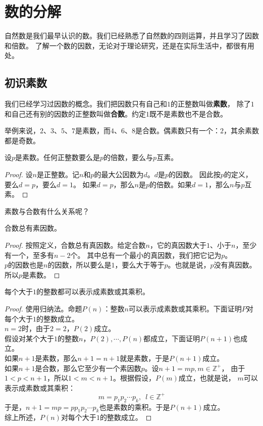 \documentclass[12pt,UTF8]{ctexbook}
\begin{document}
\chapter{数的分解}
自然数是我们最早认识的数。我们已经熟悉了自然数的四则运算，并且学习了因数和倍数。
了解一个数的因数，无论对于理论研究，还是在实际生活中，都很有用处。
\section{初识素数}
我们已经学习过因数的概念。我们把因数只有自己和$1$的正整数叫做\textbf{素数}，
除了$1$和自己还有别的因数的正整数叫做\textbf{合数}。约定$1$既不是素数也不是合数。

举例来说，$2$、$3$、$5$、$7$是素数，而$4$、$6$、$8$是合数。偶素数只有一个：$2$，其余素数都是奇数。

\begin{tm}\label{tm:1-0-0}
    设$p$是素数。任何正整数要么是$p$的倍数，要么与$p$互素。
\end{tm}
\begin{proof}
    设$n$是正整数。记$n$和$p$的最大公因数为$d$。$d$是$p$的因数。
    因此按$p$的定义，要么$d = p$，要么$d = 1$。
    如果$d = p$，那么$n$是$p$的倍数。如果$d = 1$，那么$n$与$p$互素。
\end{proof}

素数与合数有什么关系呢？

\begin{tm}\label{tm:1-0-4}
    合数总有素因数。
\end{tm}
\begin{proof}
    按照定义，合数总有真因数。给定合数$n$，它的真因数大于$1$、小于$n$，至少有一个，至多有$n-2$个。
    其中总有一个最小的真因数，我们把它记为$p$。\\
    $p$的因数也是$n$的因数，所以要么是$1$，要么大于等于$p$。也就是说，$p$没有真因数。所以$p$是素数。
\end{proof}

\begin{tm}\label{tm:1-0-6}
    每个大于$1$的整数都可以表示成素数或其乘积。
\end{tm}
\begin{proof}
    使用归纳法。命题$P(n)$：整数$n$可以表示成素数或其乘积。下面证明$P$对每个大于$1$的整数成立。\\
    $n=2$时，由于$2 = 2$，$P(2)$成立。\\
    假设对某个大于$1$的整数$n$，$P(2), \cdots, P(n)$都成立，下面证明$P(n+1)$也成立。\\
    如果$n+1$是素数，那么$n+1 = n+1$就是素数，于是$P(n+1)$成立。\\
    如果$n+1$是合数，那么它至少有一个素因数$p$。设$n+1 = mp, m\in\mathbb{Z}^+$，
    由于$1<p<n+1$，所以$1< m < n+1$。根据假设，$P(m)$成立，也就是说，
    $m$可以表示成素数或其乘积：
    $$ m = p_1 p_2\cdots p_k, \,\,\, l\in\mathbb{Z}^+$$
    于是，$n+1 = mp = pp_1 p_2\cdots p_k$也是素数的乘积。于是$P(n+1)$成立。\\
    综上所述，$P(n)$对每个大于$1$的整数成立。
\end{proof}
\end{document}
